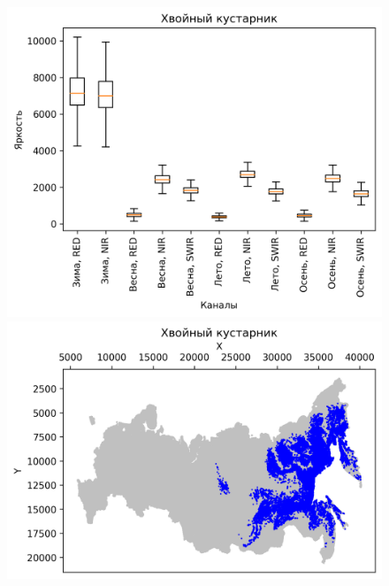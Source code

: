 \documentclass[14pt, a4paper, oneside]{extarticle}
\begin{document}
\begin{figure}[H]
    \centering
    \includegraphics[]{class-5-boxplot}
    \includegraphics[]{class-5-map}
\end{figure}
\end{document}
